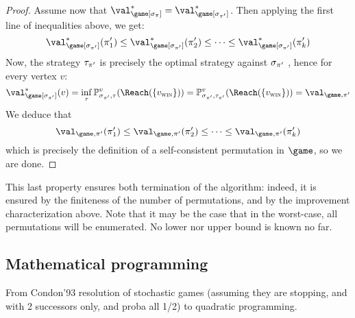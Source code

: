 \begin{proof}
  \medskip Assume now that $\val^*_{\game[\sigma_\perm]} =
  \val^*_{\game[\sigma_{\perm'}]}$. Then applying the first line of
  inequalities above, we get:
  \[
  \val^*_{\game[\sigma_{\perm'}]}(\perm'_1) \le
  \val^*_{\game[\sigma_{\perm'}]}(\perm'_2) \le \dots \le
  \val^*_{\game[\sigma_{\perm'}]}(\perm'_k)
  \]
  Now, the strategy $\tau_{\pi'}$ is precisely the optimal strategy
  against $\sigma_{\pi'}$ , hence for every vertex $v$:
  \[
  \val^*_{\game[\sigma_{\perm'}]}(v) = \inf_\tau
  \probm^v_{\sigma_{\perm'},\tau} (\Reach(\{\vwin\})) =
  \probm^v_{\sigma_{\perm'},\tau_{\perm'}} (\Reach(\{\vwin\})) =
  \val_{\game,\perm'}
  \]
  We deduce that
  \[
  \val_{\game,\perm'}(\perm'_1) \le \val_{\game,\perm'}(\perm'_2) \le
  \dots \le \val_{\game,\perm'}(\perm'_k)
  \]
  which is precisely the definition of a self-consistent permutation
  in $\game$, so we are done.
\end{proof}

This last property ensures both termination of the algorithm: indeed,
it is ensured by the finiteness of the number of permutations, and by
the improvement characterization above. Note that it may be the case
that in the worst-case, all permutations will be enumerated. No lower
nor upper bound is known no far.



\subsection{Mathematical programming}
From Condon'93 resolution of stochastic games (assuming they are
stopping, and with 2 successors only, and proba all 1/2) to quadratic
programming.
